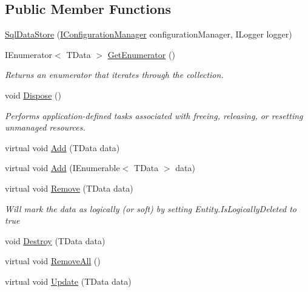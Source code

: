 \subsection*{Public Member Functions}
\begin{DoxyCompactItemize}
\item 
\hyperlink{classCqrs_1_1DataStores_1_1SqlDataStore_a0ce9b3f74799e463d4f53eda386d5577_a0ce9b3f74799e463d4f53eda386d5577}{Sql\+Data\+Store} (\hyperlink{interfaceCqrs_1_1Configuration_1_1IConfigurationManager}{I\+Configuration\+Manager} configuration\+Manager, I\+Logger logger)
\item 
I\+Enumerator$<$ T\+Data $>$ \hyperlink{classCqrs_1_1DataStores_1_1SqlDataStore_a774a0a12d6a89479cf25191916f51c47_a774a0a12d6a89479cf25191916f51c47}{Get\+Enumerator} ()
\begin{DoxyCompactList}\small\item\em Returns an enumerator that iterates through the collection. \end{DoxyCompactList}\item 
void \hyperlink{classCqrs_1_1DataStores_1_1SqlDataStore_a975c0087677987dffccc4f0ffa97e691_a975c0087677987dffccc4f0ffa97e691}{Dispose} ()
\begin{DoxyCompactList}\small\item\em Performs application-\/defined tasks associated with freeing, releasing, or resetting unmanaged resources. \end{DoxyCompactList}\item 
virtual void \hyperlink{classCqrs_1_1DataStores_1_1SqlDataStore_abcca53d2e93dbdfb193a9fb0996849c5_abcca53d2e93dbdfb193a9fb0996849c5}{Add} (T\+Data data)
\item 
virtual void \hyperlink{classCqrs_1_1DataStores_1_1SqlDataStore_a45aa105f2571510223c6073804690487_a45aa105f2571510223c6073804690487}{Add} (I\+Enumerable$<$ T\+Data $>$ data)
\item 
virtual void \hyperlink{classCqrs_1_1DataStores_1_1SqlDataStore_a898d15db199f054865a96ac646bf54fb_a898d15db199f054865a96ac646bf54fb}{Remove} (T\+Data data)
\begin{DoxyCompactList}\small\item\em Will mark the {\itshape data}  as logically (or soft) by setting Entity.\+Is\+Logically\+Deleted to true \end{DoxyCompactList}\item 
void \hyperlink{classCqrs_1_1DataStores_1_1SqlDataStore_a5ec396c9eb202c8de931c1546c721ca3_a5ec396c9eb202c8de931c1546c721ca3}{Destroy} (T\+Data data)
\item 
virtual void \hyperlink{classCqrs_1_1DataStores_1_1SqlDataStore_abb88337dccf3d5372f6b0920d5d26ebd_abb88337dccf3d5372f6b0920d5d26ebd}{Remove\+All} ()
\item 
virtual void \hyperlink{classCqrs_1_1DataStores_1_1SqlDataStore_a8f85191cecef92d003620d4064584bb2_a8f85191cecef92d003620d4064584bb2}{Update} (T\+Data data)
\end{DoxyCompactItemize}
